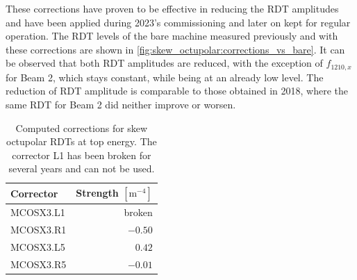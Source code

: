 These corrections have proven to be effective in reducing the RDT amplitudes and have been applied
during 2023's commissioning and later on kept for regular operation. The RDT levels of the bare
machine measured previously and with these corrections are shown in
\cref{fig:skew_octupolar:corrections_vs_bare}. It can be observed that both RDT amplitudes are
reduced, with the exception of $f_{1210,x}$ for Beam 2, which stays constant, while being at an
already low level. The reduction of RDT amplitude is comparable to those obtained in 2018, where the
same RDT for Beam 2 did neither improve or worsen.


\begin{table}[!htb]
    \centering
    \begin{tabular}{lr}
      \toprule
      Corrector    &    Strength $[\text{m}^{-4}]$ \\
      \midrule
      MCOSX3.L1    &           broken  \\
      MCOSX3.R1    &           $-0.50$ \\
      MCOSX3.L5    &           $ 0.42$ \\
      MCOSX3.R5    &           $-0.01$ \\
      \bottomrule
    \end{tabular}
    \caption{Computed corrections for skew octupolar RDTs at top energy. The corrector L1 has been 
    broken for several years and can not be used.}
    \label{tab:skew_octupolar:correction_strengths}
\end{table}
 
